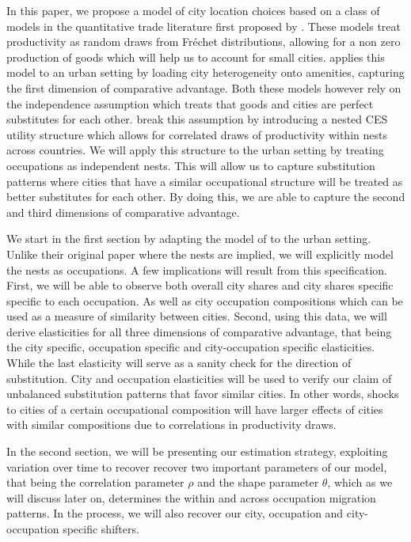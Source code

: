 \documentclass[10pt]{article}
\begin{document}
In this paper, we propose a model of city location choices based on a class of models in the quantitative trade literature first proposed by \cite{ek}. These models treat productivity as random draws from Fr\'{e}chet distributions, allowing for a non zero production of goods which will help us to account for small cities. \cite{redding} applies this model to an urban setting by loading city heterogeneity onto amenities, capturing the first dimension of comparative advantage. Both these models however rely on the independence assumption which treats that goods and cities are perfect substitutes for each other. \cite{lindandramondo} break this assumption by introducing a nested CES utility structure which allows for correlated draws of productivity within nests across countries. We will apply this structure to the urban setting by treating occupations as independent nests. This will allow us to capture substitution patterns where cities that have a similar occupational structure will be treated as better substitutes for each other. By doing this, we are able to capture the second and third dimensions of comparative advantage.

We start in the first section by adapting the model of \cite{lindandramondo} to the urban setting. Unlike their original paper where the nests are implied, we will explicitly model the nests as occupations. A few implications will result from this specification. First, we will be able to observe both overall city shares and city shares specific specific to each occupation. As well as city occupation compositions which can be used as a measure of similarity between cities. Second, using this data, we will derive elasticities for all three dimensions of comparative advantage, that being the city specific, occupation specific and city-occupation specific elasticities. While the last elasticity will serve as a sanity check for the direction of substitution. City and occupation elasticities will be used to verify our claim of unbalanced substitution patterns that favor similar cities. In other words, shocks to cities of a certain occupational composition will have larger effects of cities with similar compositions due to correlations in productivity draws.

In the second section, we will be presenting our estimation strategy, exploiting variation over time to recover recover two important parameters of our model, that being the correlation parameter $\rho$ and the shape parameter $\theta$, which as we will discuss later on, determines the within and across occupation migration patterns. In the process, we will also recover our city, occupation and city-occupation specific shifters.
\end{document}
